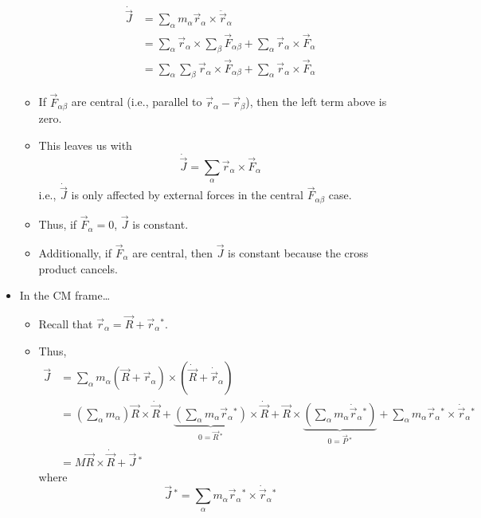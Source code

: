 \documentclass[../notes.tex]{subfiles}
\begin{document}
\begin{itemize}
\begin{itemize}
        \begin{align*}
            \dot{\vec{J}} &= \sum_\alpha m_\alpha\vec{r}_\alpha\times\ddot{\vec{r}}_\alpha\\
            &= \sum_\alpha\vec{r}_\alpha\times\sum_\beta\vec{F}_{\alpha\beta}+\sum_\alpha\vec{r}_\alpha\times\vec{F}_\alpha\\
            &= \sum_\alpha\sum_\beta\vec{r}_\alpha\times\vec{F}_{\alpha\beta}+\sum_\alpha\vec{r}_\alpha\times\vec{F}_\alpha
        \end{align*}
        \item If $\vec{F}_{\alpha\beta}$ are central (i.e., parallel to $\vec{r}_\alpha-\vec{r}_\beta$), then the left term above is zero.
        \item This leaves us with
        \begin{equation*}
            \dot{\vec{J}} = \sum_\alpha\vec{r}_\alpha\times\vec{F}_\alpha
        \end{equation*}
        i.e., $\dot{\vec{J}}$ is only affected by external forces in the central $\vec{F}_{\alpha\beta}$ case.
        \item Thus, if $\vec{F}_\alpha=0$, $\vec{J}$ is constant.
        \item Additionally, if $\vec{F}_\alpha$ are central, then $\vec{J}$ is constant because the cross product cancels.
    \end{itemize}
    \item In the CM frame\dots
    \begin{itemize}
        \item Recall that $\vec{r}_\alpha=\vec{R}+\vec{r}_\alpha{}^*$.
        \item Thus,
        \begin{align*}
            \vec{J} &= \sum_\alpha m_\alpha(\vec{R}+\vec{r}_\alpha)\times(\dot{\vec{R}}+\dot{\vec{r}}_\alpha)\\
            &= \left( \sum_\alpha m_\alpha \right)\vec{R}\times\dot{\vec{R}}+\underbrace{\left( \sum_\alpha m_\alpha\vec{r}_\alpha{}^* \right)}_{0=\vec{R}{\,}^*}\times\dot{\vec{R}}+\vec{R}\times\underbrace{\left( \sum_\alpha m_\alpha\dot{\vec{r}}_\alpha{}^* \right)}_{0=\vec{P}{\,}^*}+\sum_\alpha m_\alpha\vec{r}_\alpha{}^*\times\dot{\vec{r}}_\alpha{}^*\\
            &= M\vec{R}\times\dot{\vec{R}}+\vec{J}{\,}^*
        \end{align*}
        where
        \begin{equation*}
            \vec{J}{\,}^* = \sum_\alpha m_\alpha\vec{r}_\alpha{}^*\times\dot{\vec{r}}_\alpha{}^*

\end{equation*}
\end{itemize}
\end{itemize}
\end{document}
